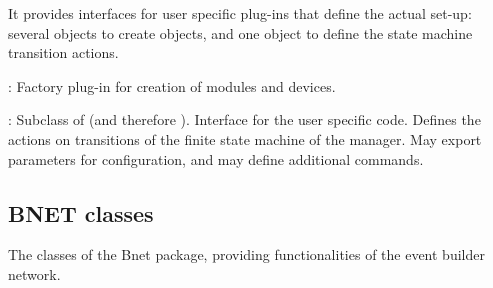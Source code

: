 \begin{description}
\begin{compactenum}
\begin{compactitem}[$\bullet$]
\end{compactitem}
      
      \item It provides interfaces for user specific plug-ins that define 
      the actual set-up: \\
      several  objects to create objects, and 
      one  object to define the state machine transition actions.
\end{compactenum}

\item[\class{dabc::Factory}] : 
	Factory plug-in for creation of modules and devices.

\item[\class{dabc::Application}] : 
Subclass of  
   (and therefore ). Interface for the user specific code. 
   Defines the actions on transitions of the finite state machine of the manager. 
   May export parameters for configuration, and may define additional commands.
\end{description}

\subsection{BNET classes}
\label{prog_bnet_classes}
The classes of the Bnet package, providing functionalities of the event builder network.


